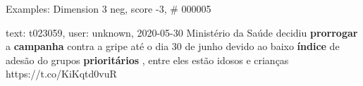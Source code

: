 \begin{frame}{Examples: Dimension 3 neg, score -3, \# 000005}
\footnotesize
\begin{alertblock}{text: t023059, user: unknown, 2020-05-30}
Ministério da Saúde decidiu \textbf{prorrogar} a \textbf{campanha} contra a 
gripe até o dia 30 de junho devido ao baixo \textbf{índice} de adesão do grupos 
\textbf{prioritários} , entre eles estão idosos e crianças 
https://t.co/KiKqtd0vuR 
\end{alertblock}
\end{frame}

